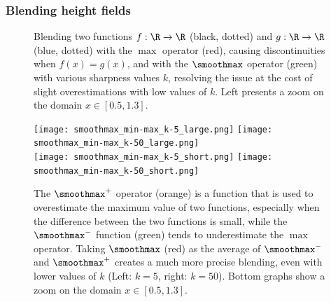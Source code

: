 \subsubsection{Blending height fields}
\label{subsubsec:height-functions-blending}

\begin{figure}[H]
\caption{Blending two functions $f: \R \to \R$ (black, dotted) and $g: \R \to \R$ (blue, dotted) with the $\max$ operator (red), causing discontinuities when $f(x)=g(x)$, and with the $\smoothmax$ operator (green) with various sharpness values $k$, resolving the issue at the cost of slight overestimations with low values of $k$. Left presents a zoom on the domain $x \in [0.5, 1.3]$. }
\label{fig:coral-island-blend-function-island}
\end{figure}

\begin{figure}[H]

\texttt{[image: smoothmax\_min-max\_k-5\_large.png]}
\texttt{[image: smoothmax\_min-max\_k-50\_large.png]} \\
\texttt{[image: smoothmax\_min-max\_k-5\_short.png]}
\texttt{[image: smoothmax\_min-max\_k-50\_short.png]}

\caption{The $\smoothmax^+$ operator (orange) is a function that is used to overestimate the maximum value of two functions, especially when the difference between the two functions is small, while the $\smoothmax^-$ function (green) tends to underestimate the $\max$ operator. Taking $\smoothmax$ (red) as the average of $\smoothmax^-$ and $\smoothmax^+$ creates a much more precise blending, even with lower values of $k$ (Left: $k=5$, right: $k=50$). Bottom graphs show a zoom on the domain $x \in [0.5, 1.3]$.}
\label{fig:coral-island-blend-function-island-with-upper}
\end{figure}

